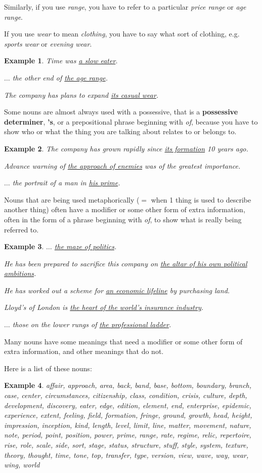 \documentclass[oneside]{book}
\numberwithin{equation}{section}
\newtheorem{example}{Example}[section]
\begin{document}
%
Similarly, if you use \textit{range}, you have to refer to a particular \textit{price range} or \textit{age range}.

If you use \textit{wear} to mean \textit{clothing}, you have to say what sort of clothing, e.g. \textit{sports wear} or \textit{evening wear}.
\begin{example}
    Time was \underline{a slow eater}.
    
    $\ldots$ the other end of \underline{the age range}.
    
    The company has plans to expand \underline{its casual wear}.
\end{example}
%
\noindent{} Some nouns are almost always used with a possessive, that is a \textbf{possessive determiner}, \textbf{'s}, or a prepositional phrase beginning with \textit{of}, because you have to show who or what the thing you are talking about relates to or belongs to.
\begin{example}
    The company has grown rapidly since \underline{its formation} 10 years ago.
    
    Advance warning of \underline{the approach of enemies} was of the greatest importance.
    
    $\ldots$ the portrait of a man in \underline{his prime}.
\end{example}
%
\noindent{} Nouns that are being used metaphorically ($=$ when 1 thing is used to describe another thing) often have a modifier or some other form of extra information, often in the form of a phrase beginning with \textit{of}, to show what is really being referred to.
\begin{example}
    $\ldots$ \underline{the maze of politics}.
    
    He has been prepared to sacrifice this company on \underline{the altar of his own political ambitions}.
    
    He has worked out a scheme for \underline{an economic lifeline} by purchasing land.
    
    Lloyd's of London is \underline{the heart of the world's insurance industry}.
    
    $\ldots$ those on the lower rungs of \underline{the professional ladder}.
\end{example}
%
\noindent{} Many nouns have some meanings that need a modifier or some other form of extra information, and other meanings that do not.

%
Here is a list of these nouns:
\begin{example}
    affair, approach, area, back, band, base, bottom, boundary, branch, case, center, circumstances, citizenship, class, condition, crisis, culture, depth, development, discovery, eater, edge, edition, element, end, enterprise, epidemic, experience, extent, feeling, field, formation, fringe, ground, growth, head, height, impression, inception, kind, length, level, limit, line, matter, movement, nature, note, period, point, position, power, prime, range, rate, regime, relic, repertoire, rise, role, scale, side, sort, stage, status, structure, stuff, style, system, texture, theory, thought, time, tone, top, transfer, type, version, view, wave, way, wear, wing, world
\end{example}
\end{document}
